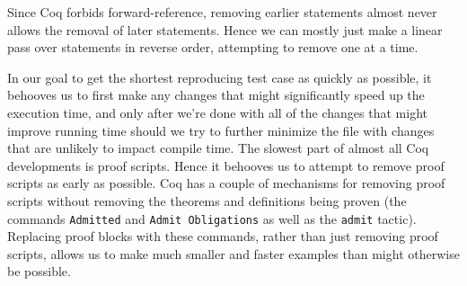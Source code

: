 \documentclass[a4paper,USenglish,cleveref,autoref,thm-restate]{lipics-v2021}
\begin{document}
Since Coq forbids forward-reference, removing earlier statements almost never allows the removal of later statements.
Hence we can mostly just make a linear pass over statements in reverse order, attempting to remove one at a time.

In our goal to get the shortest reproducing test case as quickly as possible, it behooves us to first make any changes that might significantly speed up the execution time, and only after we're done with all of the changes that might improve running time should we try to further minimize the file with changes that are unlikely to impact compile time.
  The slowest part of almost all Coq developments is proof scripts.
  Hence it behooves us to attempt to remove proof scripts as early as possible.
  Coq has a couple of mechanisms for removing proof scripts without removing the theorems and definitions being proven (the commands \verb|Admitted| and \verb|Admit Obligations| as well as the \verb|admit| tactic).
  Replacing proof blocks with these commands, rather than just removing proof scripts, allows us to make much smaller and faster examples than might otherwise be possible.
\end{document}
